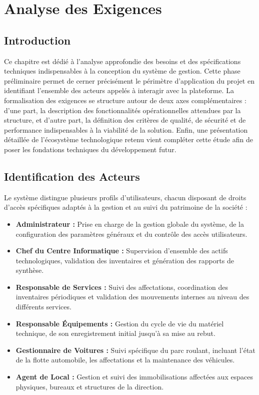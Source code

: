 \chapter{Analyse des Exigences}

\section{Introduction}

Ce chapitre est dédié à l'analyse approfondie des besoins et des spécifications techniques indispensables à la conception du système de gestion. Cette phase préliminaire permet de cerner précisément le périmètre d'application du projet en identifiant l'ensemble des acteurs appelés à interagir avec la plateforme. La formalisation des exigences se structure autour de deux axes complémentaires : d'une part, la description des fonctionnalités opérationnelles attendues par la structure, et d'autre part, la définition des critères de qualité, de sécurité et de performance indispensables à la viabilité de la solution. Enfin, une présentation détaillée de l'écosystème technologique retenu vient compléter cette étude afin de poser les fondations techniques du développement futur.

\section{Identification des Acteurs}

Le système distingue plusieurs profils d'utilisateurs, chacun disposant de droits d'accès spécifiques adaptés à la gestion et au suivi du patrimoine de la société :

\begin{itemize}[label=$\bullet$]
   \item \textbf{Administrateur :} Prise en charge de la gestion globale du système, de la configuration des paramètres généraux et du contrôle des accès utilisateurs.
   \item \textbf{Chef du Centre Informatique :} Supervision d'ensemble des actifs technologiques, validation des inventaires et génération des rapports de synthèse.
   \item \textbf{Responsable de Services :} Suivi des affectations, coordination des inventaires périodiques et validation des mouvements internes au niveau des différents services.
   \item \textbf{Responsable Équipements :} Gestion du cycle de vie du matériel technique, de son enregistrement initial jusqu'à sa mise au rebut.
   \item \textbf{Gestionnaire de Voitures :} Suivi spécifique du parc roulant, incluant l'état de la flotte automobile, les affectations et la maintenance des véhicules.
   \item \textbf{Agent de Local :} Gestion et suivi des immobilisations affectées aux espaces physiques, bureaux et structures de la direction.
\end{itemize}

